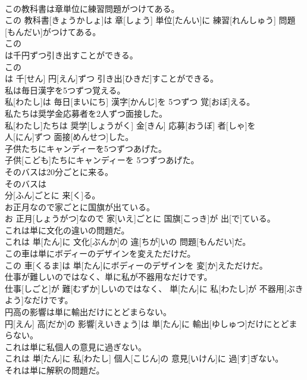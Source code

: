 \documentclass[8pt]{extreport}
\begin{document}
\begin{CJK}{UTF8}{min}
\\	この教科書は章単位に練習問題がつけてある。	
\\	この 教科書[きょうかしょ]は 章[しょう] 単位[たんい]に 練習[れんしゅう] 問題[もんだい]がつけてある。
\\	この
\\	は千円ずつ引き出すことができる。	
\\	この 
\\	は 千[せん] 円[えん]ずつ 引き出[ひきだ]すことができる。
\\	私は毎日漢字を5つずつ覚える。	
\\	私[わたし]は 毎日[まいにち] 漢字[かんじ]を 5つずつ 覚[おぼ]える。
\\	私たちは奨学金応募者を2人ずつ面接した。	
\\	私[わたし]たちは 奨学[しょうがく] 金[きん] 応募[おうぼ] 者[しゃ]を 
\\	人[にん]ずつ 面接[めんせつ]した。
\\	子供たちにキャンディーを5つずつあげた。	
\\	子供[こども]たちにキャンディーを 5つずつあげた。
\\	そのバスは20分ごとに来る。	
\\	そのバスは 
\\	分[ふん]ごとに 来[く]る。
\\	お正月なので家ごとに国旗が出ている。	
\\	お 正月[しょうがつ]なので 家[いえ]ごとに 国旗[こっき]が 出[で]ている。
\\	これは単に文化の違いの問題だ。	
\\	これは 単[たん]に 文化[ぶんか]の 違[ちが]いの 問題[もんだい]だ。
\\	この車は単にボディーのデザインを変えただけだ。	
\\	この 車[くるま]は 単[たん]にボディーのデザインを 変[か]えただけだ。
\\	仕事が難しいのではなく、単に私が不器用なだけです。	
\\	仕事[しごと]が 難[むずか]しいのではなく、 単[たん]に 私[わたし]が 不器用[ぶきよう]なだけです。
\\	円高の影響は単に輸出だけにとどまらない。	
\\	円[えん] 高[だか]の 影響[えいきょう]は 単[たん]に 輸出[ゆしゅつ]だけにとどまらない。
\\	これは単に私個人の意見に過ぎない。	
\\	これは 単[たん]に 私[わたし] 個人[こじん]の 意見[いけん]に 過[す]ぎない。
\\	それは単に解釈の問題だ。	

\end{CJK}
\end{document}
